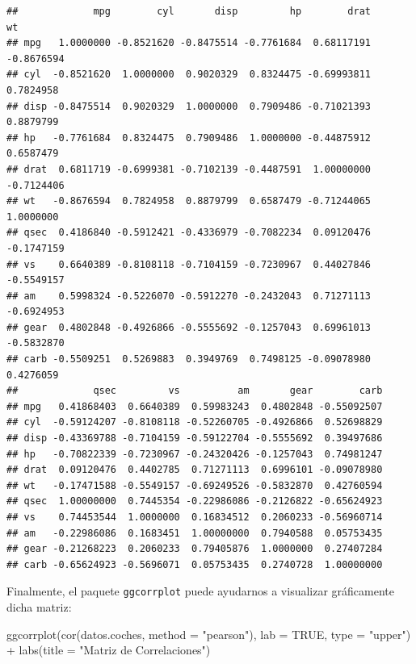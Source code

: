 \documentclass[
]{book}
\newenvironment{Shaded}{\begin{snugshade}}{\end{snugshade}}
\newcommand{\AttributeTok}[1]{\textcolor[rgb]{0.77,0.63,0.00}{#1}}
\newcommand{\ConstantTok}[1]{\textcolor[rgb]{0.00,0.00,0.00}{#1}}
\newcommand{\FunctionTok}[1]{\textcolor[rgb]{0.00,0.00,0.00}{#1}}
\newcommand{\NormalTok}[1]{#1}
\newcommand{\SpecialCharTok}[1]{\textcolor[rgb]{0.00,0.00,0.00}{#1}}
\newcommand{\StringTok}[1]{\textcolor[rgb]{0.31,0.60,0.02}{#1}}
\begin{document}
\begin{verbatim}
##             mpg        cyl       disp         hp        drat         wt
## mpg   1.0000000 -0.8521620 -0.8475514 -0.7761684  0.68117191 -0.8676594
## cyl  -0.8521620  1.0000000  0.9020329  0.8324475 -0.69993811  0.7824958
## disp -0.8475514  0.9020329  1.0000000  0.7909486 -0.71021393  0.8879799
## hp   -0.7761684  0.8324475  0.7909486  1.0000000 -0.44875912  0.6587479
## drat  0.6811719 -0.6999381 -0.7102139 -0.4487591  1.00000000 -0.7124406
## wt   -0.8676594  0.7824958  0.8879799  0.6587479 -0.71244065  1.0000000
## qsec  0.4186840 -0.5912421 -0.4336979 -0.7082234  0.09120476 -0.1747159
## vs    0.6640389 -0.8108118 -0.7104159 -0.7230967  0.44027846 -0.5549157
## am    0.5998324 -0.5226070 -0.5912270 -0.2432043  0.71271113 -0.6924953
## gear  0.4802848 -0.4926866 -0.5555692 -0.1257043  0.69961013 -0.5832870
## carb -0.5509251  0.5269883  0.3949769  0.7498125 -0.09078980  0.4276059
##             qsec         vs          am       gear        carb
## mpg   0.41868403  0.6640389  0.59983243  0.4802848 -0.55092507
## cyl  -0.59124207 -0.8108118 -0.52260705 -0.4926866  0.52698829
## disp -0.43369788 -0.7104159 -0.59122704 -0.5555692  0.39497686
## hp   -0.70822339 -0.7230967 -0.24320426 -0.1257043  0.74981247
## drat  0.09120476  0.4402785  0.71271113  0.6996101 -0.09078980
## wt   -0.17471588 -0.5549157 -0.69249526 -0.5832870  0.42760594
## qsec  1.00000000  0.7445354 -0.22986086 -0.2126822 -0.65624923
## vs    0.74453544  1.0000000  0.16834512  0.2060233 -0.56960714
## am   -0.22986086  0.1683451  1.00000000  0.7940588  0.05753435
## gear -0.21268223  0.2060233  0.79405876  1.0000000  0.27407284
## carb -0.65624923 -0.5696071  0.05753435  0.2740728  1.00000000
\end{verbatim}

Finalmente, el paquete \texttt{ggcorrplot} puede ayudarnos a visualizar gráficamente dicha matriz:

\begin{Shaded}
\begin{Highlighting}[]
\FunctionTok{ggcorrplot}\NormalTok{(}\FunctionTok{cor}\NormalTok{(datos.coches, }\AttributeTok{method =} \StringTok{"pearson"}\NormalTok{), }
           \AttributeTok{lab =} \ConstantTok{TRUE}\NormalTok{,}
           \AttributeTok{type =} \StringTok{"upper"}\NormalTok{) }\SpecialCharTok{+}
  \FunctionTok{labs}\NormalTok{(}\AttributeTok{title =} \StringTok{"Matriz de Correlaciones"}\NormalTok{)}
\end{Highlighting}
\end{Shaded}
\end{document}

